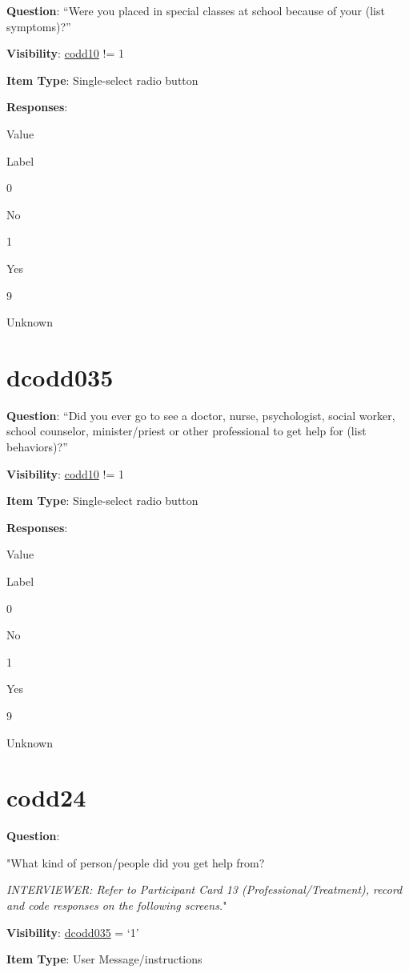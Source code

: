 \documentclass[]{book}
\begin{document}
\textbf{Question}: ``Were you placed in special classes at school because of your (list symptoms)?''

\textbf{Visibility}: \protect\hyperlink{codd10}{codd10} != 1

\textbf{Item Type}: Single-select radio button

\textbf{Responses}:

Value

Label

0

No

1

Yes

9

Unknown

\hypertarget{dcodd035}{%
\section{dcodd035}\label{dcodd035}}

\textbf{Question}: ``Did you ever go to see a doctor, nurse, psychologist, social worker, school counselor, minister/priest or other professional to get help for (list behaviors)?''

\textbf{Visibility}: \protect\hyperlink{codd10}{codd10} != 1

\textbf{Item Type}: Single-select radio button

\textbf{Responses}:

Value

Label

0

No

1

Yes

9

Unknown

\hypertarget{codd24}{%
\section{codd24}\label{codd24}}

\textbf{Question}:

"What kind of person/people did you get help from?

\emph{INTERVIEWER: Refer to Participant Card 13 (Professional/Treatment), record and code responses on the following screens.}"

\textbf{Visibility}: \protect\hyperlink{dcodd035}{dcodd035} = `1'

\textbf{Item Type}: User Message/instructions
\end{document}
